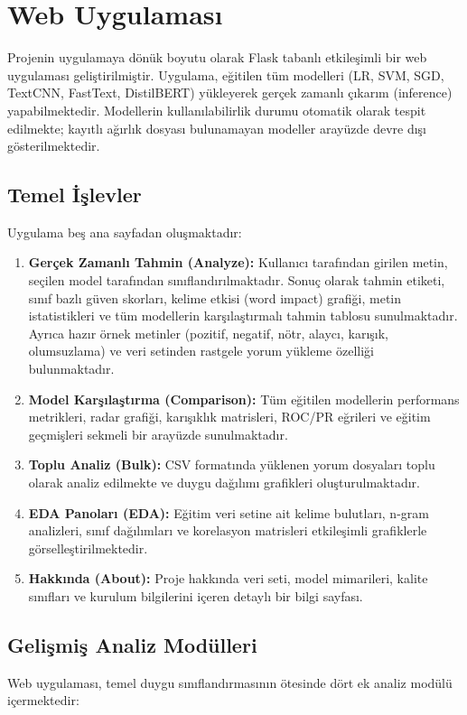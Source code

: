 \documentclass[conference]{IEEEtran}
\begin{document}
\section{Web Uygulaması}
\label{sec:webapp}

Projenin uygulamaya dönük boyutu olarak Flask tabanlı etkileşimli bir web uygulaması geliştirilmiştir. Uygulama, eğitilen tüm modelleri (LR, SVM, SGD, TextCNN, FastText, DistilBERT) yükleyerek gerçek zamanlı çıkarım (inference) yapabilmektedir. Modellerin kullanılabilirlik durumu otomatik olarak tespit edilmekte; kayıtlı ağırlık dosyası bulunamayan modeller arayüzde devre dışı gösterilmektedir.

\subsection{Temel İşlevler}
Uygulama beş ana sayfadan oluşmaktadır:

\begin{enumerate}
    \item \textbf{Gerçek Zamanlı Tahmin (Analyze):} Kullanıcı tarafından girilen metin, seçilen model tarafından sınıflandırılmaktadır. Sonuç olarak tahmin etiketi, sınıf bazlı güven skorları, kelime etkisi (word impact) grafiği, metin istatistikleri ve tüm modellerin karşılaştırmalı tahmin tablosu sunulmaktadır. Ayrıca hazır örnek metinler (pozitif, negatif, nötr, alaycı, karışık, olumsuzlama) ve veri setinden rastgele yorum yükleme özelliği bulunmaktadır.
    \item \textbf{Model Karşılaştırma (Comparison):} Tüm eğitilen modellerin performans metrikleri, radar grafiği, karışıklık matrisleri, ROC/PR eğrileri ve eğitim geçmişleri sekmeli bir arayüzde sunulmaktadır.
    \item \textbf{Toplu Analiz (Bulk):} CSV formatında yüklenen yorum dosyaları toplu olarak analiz edilmekte ve duygu dağılımı grafikleri oluşturulmaktadır.
    \item \textbf{EDA Panoları (EDA):} Eğitim veri setine ait kelime bulutları, n-gram analizleri, sınıf dağılımları ve korelasyon matrisleri etkileşimli grafiklerle görselleştirilmektedir.
    \item \textbf{Hakkında (About):} Proje hakkında veri seti, model mimarileri, kalite sınıfları ve kurulum bilgilerini içeren detaylı bir bilgi sayfası.
\end{enumerate}

\subsection{Gelişmiş Analiz Modülleri}
Web uygulaması, temel duygu sınıflandırmasının ötesinde dört ek analiz modülü içermektedir:
\end{document}
